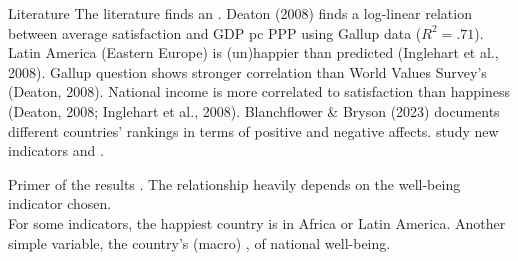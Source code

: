 \documentclass[aspectratio=169,xcolor=dvipsnames, 11pt,mathserif]{beamer}
\begin{document}
\begin{frame}{Literature}
    \ip The literature finds an .
    \ip Deaton (2008) finds a log-linear relation between average satisfaction and GDP pc PPP using Gallup data ($R^2=.71$).
    \ip Latin America (Eastern Europe) is (un)happier than predicted (Inglehart et al., 2008).
    \ip 
    Gallup question shows stronger correlation than World Values Survey's (Deaton, 2008).
    \ip National income is more correlated to satisfaction than happiness (Deaton, 2008; Inglehart et al., 2008).
    \ip Blanchflower \& Bryson (2023) documents different countries' rankings in terms of positive and negative affects.
    \ip {} study new indicators and .
    \ee
\end{frame}

\begin{frame}{Primer of the results}
    \bbvsp
    \ip {}.
    \ip The relationship heavily depends on the well-being indicator chosen. \pause \\ For some indicators, the happiest country is in Africa or Latin America.\pause
    \ip Another simple variable, the country's (macro) ,  of national well-being.
    \ee
\end{frame}
\end{document}
